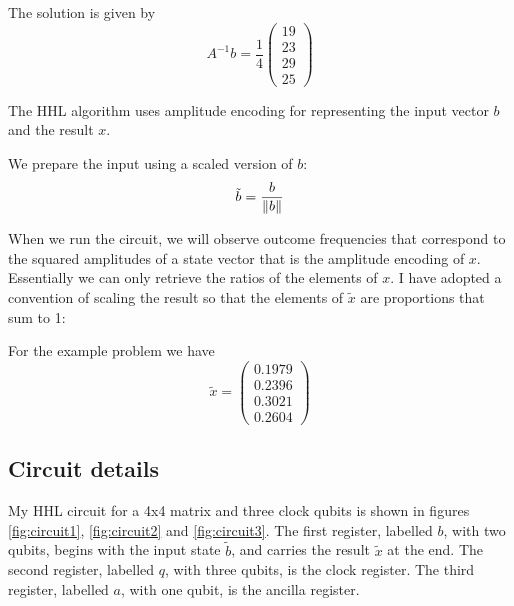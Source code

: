 \documentclass[12pt]{extarticle}
\begin{document}
The solution is given by
\begin{equation}\label{eq:solutionx4}
A^{-1}b = \frac{1}{4}\begin{pmatrix} 19 \\ 23 \\ 29 \\ 25 \end{pmatrix}
\end{equation}

The HHL algorithm uses amplitude encoding for representing the input vector $b$ and the result $x$.

We prepare the input using a scaled version of $b$:
\[
\tilde{b} = \frac{b}{\norm{b}}
\]

When we run the circuit, we will observe outcome frequencies that correspond to the squared amplitudes of a state vector
that is the amplitude encoding of $x$.
Essentially we can only retrieve the ratios of the elements of $x$.
I have adopted a convention of scaling the result so that the elements of $\tilde{x}$ are proportions that sum to 1:

For the example problem we have
\begin{equation}\label{eq:solutionx4num}
\tilde{x} = \begin{pmatrix} 0.1979 \\ 0.2396 \\ 0.3021 \\ 0.2604 \end{pmatrix}
\end{equation}

\subsection{Circuit details}

My HHL circuit for a 4x4 matrix and three clock qubits is shown in figures \ref{fig:circuit1}, \ref{fig:circuit2} and \ref{fig:circuit3}.
The first register, labelled $b$, with two qubits, begins with the input state $\tilde{b}$, and carries the result $\tilde{x}$ at the end.
The second register, labelled $q$, with three qubits, is the clock register.
The third register, labelled $a$, with one qubit, is the ancilla register.
\end{document}

